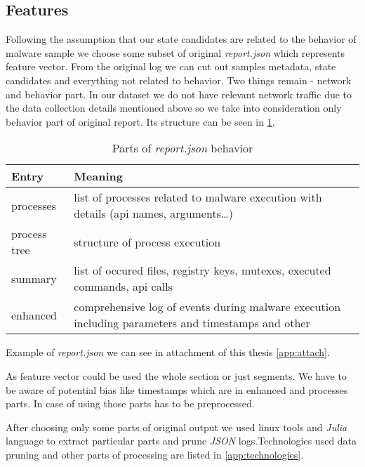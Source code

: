 \subsection{Features}
Following the assumption that our state candidates are related to the behavior of malware sample we choose some subset of original \emph{report.json} which represents feature vector. From the original log we can cut out samples metadata, state candidates and everything not related to behavior. Two things remain - network and behavior part. In our dataset we do not have relevant network traffic due to the data collection details mentioned above so we take into consideration only behavior part of original report. Its structure can be seen in \ref{tab:behavioral}.

\begin{table}[h]
    \centering
    \caption{Parts of \emph{report.json} behavior}
    \begin{tabular}{p{2cm}p{12cm}} 
        \toprule
        \textbf{Entry} &
        \textbf{Meaning} \\
        \midrule
        processes & list of processes related to malware execution with details (api names, arguments\dots) \\
        \midrule
        process tree & structure of process execution\\
        \midrule
        summary & list of occured files, registry keys, mutexes, executed commands, api calls \\
        \midrule
        enhanced & comprehensive log of events during malware execution including parameters and timestamps and other\\
        \bottomrule
    \end{tabular}
    \label{tab:behavioral}
\end{table}
Example of \emph{report.json} we can see in attachment of this thesis \ref{app:attach}.

As feature vector could be used the whole section or just segments. We have to be aware of potential bias like timestamps which are in enhanced and processes parts. In case of using those parts has to be preprocessed.

After choosing only some parts of original output we used linux tools and \emph{Julia} language to extract particular parts and prune \emph{JSON} logs.Technologies used data pruning and other parts of processing are listed in \ref{app:technologies}.


